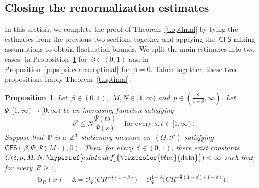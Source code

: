 \documentclass[11pt,twoside]{article} %
\numberwithin{equation}{section}
\newtheorem{proposition}[theorem]{Proposition}
\theoremstyle{definition}
\newcommand{\dataref}{\hyperref[e.data.def]{\textcolor{blue}{\ensuremath{\mathrm{data}}}}}
\newcommand*{\Zd}{\ensuremath{\mathbb{Z}^d}}
\renewcommand{\b}{\ensuremath{\mathbf{b}}}
\renewcommand{\a}{\mathbf{a}}
\newcommand{\ahom}{\bar{\a}}
\newcommand{\F}{\mathcal{F}}
\renewcommand{\P}{\mathbb{P}}
\renewcommand{\O}{\mathcal{O}}
\newcommand{\CFS}{\mathsf{CFS}}
\begin{document}
\subsection{Closing the renormalization estimates}
\label{s.fluctboot}

In this section, we complete the proof of Theorem~\ref{t.optimal} by tying the estimates from the previous two sections together and applying the~$\CFS$ mixing assumptions to obtain fluctuation bounds. 
We split the main estimates into two cases: in Proposition~\ref{p.psipsi.coarse} for~$\beta \in (0,1)$ and in Proposition~\ref{p.psipsi.coarse.optimal} for~$\beta=0$. Taken together, these two propositions imply Theorem~\ref{t.optimal}. 

\begin{proposition}
\label{p.psipsi.coarse}
Let~$\beta \in (0,1)$,~$M, N \in [1,\infty)$ and~$p \in (\frac{2}{1-\beta},\infty)$.  Let~$\Psi:[1,\infty) \to [0,\infty)$ be an increasing function satisfying
\begin{equation}  \label{e.Psi.pgrowth}
t^p \leq N \frac{\Psi(t s)}{\Psi(s)}  \quad \mbox{for every~$s, t \in [1,\infty)$}\,. 
\end{equation}
Suppose that~$\P$ is a~$\Zd$--stationary measure on~$(\Omega,\F)$ satisfying~$\CFS(\beta,\Psi,\Psi(M\cdot),0)$. Then, for every~$\delta \in (0,1)$,  there exist constants~$C(\delta,p,M,N,\dataref) < \infty$ such that, for every~$R \geq 1$, 
\begin{align}
\label{e.psipsi.coarse}
\b_R(x) - \ahom 
=
\O_{\Psi} \bigl( C R^{-\frac d2(1-\beta)}  \bigr) 
+ 
\O_{\Psi}^{1-\delta} \bigl( C R^{-\frac d2(1-\beta)(1+\delta)} \bigr)
\,.
\end{align}
\end{proposition}
\end{document}
